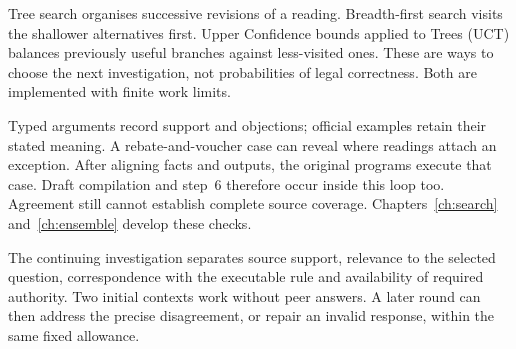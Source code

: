 \documentclass[12pt,a4paper,oneside,openany]{book}
\begin{document}
Tree search organises successive revisions of a reading. Breadth-first search
visits the shallower alternatives first. Upper Confidence bounds applied to
Trees (UCT) balances previously useful branches against less-visited ones.
These are ways to choose the next investigation, not probabilities of legal
correctness. Both are implemented with finite work limits.

\begin{MapDiagram}
\end{MapDiagram}

Typed arguments record support and objections; official examples retain their
stated meaning. A rebate-and-voucher case can reveal where readings attach an
exception. After aligning facts and outputs, the original programs execute
that case. Draft compilation and step~6 therefore occur inside this loop too.
Agreement still cannot establish complete source coverage.
Chapters~\ref{ch:search} and~\ref{ch:ensemble} develop these checks.

\clearpage
{}
The continuing investigation separates source support, relevance to the selected
question, correspondence with the executable rule and availability of required
authority. Two initial contexts work without peer answers. A later round can
then address the precise disagreement, or repair an invalid response, within
the same fixed allowance.
\end{document}
